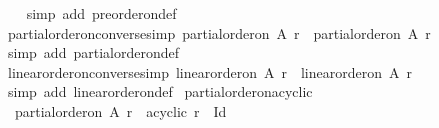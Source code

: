 \begin{isabellebody}
%
\isadelimproof
\ \ %
\endisadelimproof
%
\isatagproof
{}\isamarkupfalse%
\ {\isacharparenleft}{\kern0pt}simp\ add{\isacharcolon}{\kern0pt}\ preorder{\isacharunderscore}{\kern0pt}on{\isacharunderscore}{\kern0pt}def{\isacharparenright}{\kern0pt}%
\endisatagproof
{\isafoldproof}%
%
\isadelimproof
\isanewline
%
\endisadelimproof
\isanewline
{}\isamarkupfalse%
\ partial{\isacharunderscore}{\kern0pt}order{\isacharunderscore}{\kern0pt}on{\isacharunderscore}{\kern0pt}converse{\isacharbrackleft}{\kern0pt}simp{\isacharbrackright}{\kern0pt}{\isacharcolon}{\kern0pt}\ {\isachardoublequoteopen}partial{\isacharunderscore}{\kern0pt}order{\isacharunderscore}{\kern0pt}on\ A\ {\isacharparenleft}{\kern0pt}r{\isasyminverse}{\isacharparenright}{\kern0pt}\ {\isacharequal}{\kern0pt}\ partial{\isacharunderscore}{\kern0pt}order{\isacharunderscore}{\kern0pt}on\ A\ r{\isachardoublequoteclose}\isanewline
%
\isadelimproof
\ \ %
\endisadelimproof
%
\isatagproof
{}\isamarkupfalse%
\ {\isacharparenleft}{\kern0pt}simp\ add{\isacharcolon}{\kern0pt}\ partial{\isacharunderscore}{\kern0pt}order{\isacharunderscore}{\kern0pt}on{\isacharunderscore}{\kern0pt}def{\isacharparenright}{\kern0pt}%
\endisatagproof
{\isafoldproof}%
%
\isadelimproof
\isanewline
%
\endisadelimproof
\isanewline
{}\isamarkupfalse%
\ linear{\isacharunderscore}{\kern0pt}order{\isacharunderscore}{\kern0pt}on{\isacharunderscore}{\kern0pt}converse{\isacharbrackleft}{\kern0pt}simp{\isacharbrackright}{\kern0pt}{\isacharcolon}{\kern0pt}\ {\isachardoublequoteopen}linear{\isacharunderscore}{\kern0pt}order{\isacharunderscore}{\kern0pt}on\ A\ {\isacharparenleft}{\kern0pt}r{\isasyminverse}{\isacharparenright}{\kern0pt}\ {\isacharequal}{\kern0pt}\ linear{\isacharunderscore}{\kern0pt}order{\isacharunderscore}{\kern0pt}on\ A\ r{\isachardoublequoteclose}\isanewline
%
\isadelimproof
\ \ %
\endisadelimproof
%
\isatagproof
{}\isamarkupfalse%
\ {\isacharparenleft}{\kern0pt}simp\ add{\isacharcolon}{\kern0pt}\ linear{\isacharunderscore}{\kern0pt}order{\isacharunderscore}{\kern0pt}on{\isacharunderscore}{\kern0pt}def{\isacharparenright}{\kern0pt}%
\endisatagproof
{\isafoldproof}%
%
\isadelimproof
\isanewline
%
\endisadelimproof
\isanewline
\isanewline
{}\isamarkupfalse%
\ partial{\isacharunderscore}{\kern0pt}order{\isacharunderscore}{\kern0pt}on{\isacharunderscore}{\kern0pt}acyclic{\isacharcolon}{\kern0pt}\isanewline
\ \ {\isachardoublequoteopen}partial{\isacharunderscore}{\kern0pt}order{\isacharunderscore}{\kern0pt}on\ A\ r\ {\isasymLongrightarrow}\ acyclic\ {\isacharparenleft}{\kern0pt}r\ {\isacharminus}{\kern0pt}\ Id{\isacharparenright}{\kern0pt}{\isachardoublequoteclose}\isanewline

\end{isabellebody}
